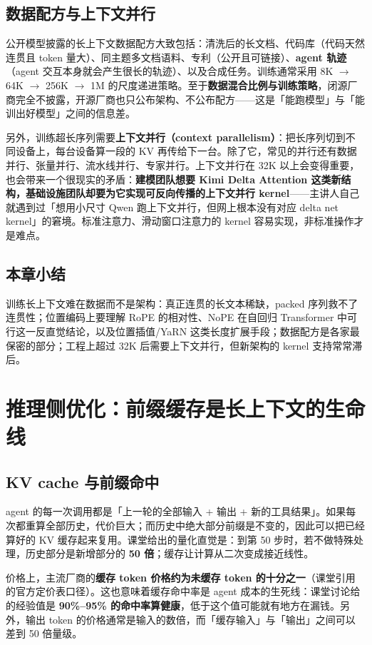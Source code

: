 \documentclass[a4paper]{article}
\begin{document}
\subsection{数据配方与上下文并行}

公开模型披露的长上下文数据配方大致包括：清洗后的长文档、代码库（代码天然连贯且 token 量大）、同主题多文档语料、专利（公开且可链接）、\textbf{agent 轨迹}（agent 交互本身就会产生很长的轨迹）、以及合成任务。训练通常采用 8K $\rightarrow$ 64K $\rightarrow$ 256K $\rightarrow$ 1M 的尺度递进策略。至于\textbf{数据混合比例与训练策略}，闭源厂商完全不披露，开源厂商也只公布架构、不公布配方——这是「能跑模型」与「能训出好模型」之间的信息差。

另外，训练超长序列需要\textbf{上下文并行（context parallelism）}：把长序列切到不同设备上，每台设备算一段的 KV 再传给下一台。除了它，常见的并行还有数据并行、张量并行、流水线并行、专家并行。上下文并行在 32K 以上会变得重要，也会带来一个很现实的矛盾：\textbf{建模团队想要 Kimi Delta Attention 这类新结构，基础设施团队却要为它实现可反向传播的上下文并行 kernel}——主讲人自己就遇到过「想用小尺寸 Qwen 跑上下文并行，但网上根本没有对应 delta net kernel」的窘境。标准注意力、滑动窗口注意力的 kernel 容易实现，非标准操作才是难点。

\subsection{本章小结}
训练长上下文难在数据而不是架构：真正连贯的长文本稀缺，packed 序列救不了连贯性；位置编码上要理解 RoPE 的相对性、NoPE 在自回归 Transformer 中可行这一反直觉结论，以及位置插值/YaRN 这类长度扩展手段；数据配方是各家最保密的部分；工程上超过 32K 后需要上下文并行，但新架构的 kernel 支持常常滞后。

\section{推理侧优化：前缀缓存是长上下文的生命线}

\subsection{KV cache 与前缀命中}

agent 的每一次调用都是「上一轮的全部输入 + 输出 + 新的工具结果」。如果每次都重算全部历史，代价巨大；而历史中绝大部分前缀是不变的，因此可以把已经算好的 KV 缓存起来复用。课堂给出的量化直觉是：到第 50 步时，若不做特殊处理，历史部分是新增部分的 \textbf{50 倍}；缓存让计算从二次变成接近线性。

价格上，主流厂商的\textbf{缓存 token 价格约为未缓存 token 的十分之一}（课堂引用的官方定价表口径）。这也意味着缓存命中率是 agent 成本的生死线：课堂讨论给的经验值是 \textbf{90\%--95\% 的命中率算健康}，低于这个值可能就有地方在漏钱。另外，输出 token 的价格通常是输入的数倍，而「缓存输入」与「输出」之间可以差到 50 倍量级。
\end{document}
